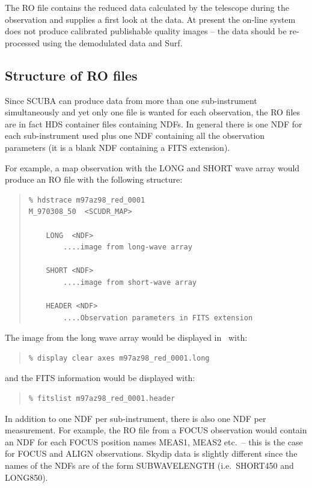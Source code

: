 \documentclass[twoside,11pt]{article}
\newcommand{\scusoft}          {{\sc Surf}}
\newcommand{\Kappa}{\xref{{\sc{Kappa}}}{sun95}{}}
\newenvironment{myquote}{\begin{quote}\begin{small}}{\end{small}\end{quote}}
\newcommand{\xref}[3]{#1}
\renewcommand{\_}{\texttt{\symbol{95}}}
\begin{document}
The RO file contains the reduced data calculated by the telescope during the
observation and supplies a first look at the data. At present the on-line
system does not produce calibrated publishable quality images -- the data
should be re-processed using the demodulated data and \scusoft.

\subsection{Structure of RO files}

Since SCUBA can produce data from more than one sub-instrument simultaneously
and yet only one file is wanted for each observation, the RO files are in fact
HDS container files containing NDFs. In general there is one NDF for each
sub-instrument used plus one NDF containing all the observation parameters (it
is a blank NDF containing a FITS extension). 

For example, a map observation with the LONG and SHORT wave array would
produce an RO file with the following structure:

\begin{myquote}
\begin{verbatim}
% hdstrace m97az98_red_0001
M_970308_50  <SCUDR_MAP>

    LONG  <NDF>
        ....image from long-wave array

    SHORT <NDF>
        ....image from short-wave array

    HEADER <NDF>
        ....Observation parameters in FITS extension
\end{verbatim}
\end{myquote}


The image from the long wave array would be displayed in \Kappa\
with:
\begin{myquote}
\begin{verbatim}
% display clear axes m97az98_red_0001.long
\end{verbatim}
\end{myquote} 
and the FITS information would be displayed with:
\begin{myquote}
\begin{verbatim}
% fitslist m97az98_red_0001.header
\end{verbatim}
\end{myquote}

In addition to one NDF per sub-instrument, there is also one NDF per
measurement. For example, the RO file from a FOCUS observation would contain
an NDF for each FOCUS position names MEAS\_1, MEAS\_2 etc.\ -- this is the
case for FOCUS and ALIGN observations. Skydip data is slightly different 
since the names of the NDFs are of the form SUB\_WAVELENGTH (i.e.\ SHORT\_450
and LONG\_850).
\end{document}
